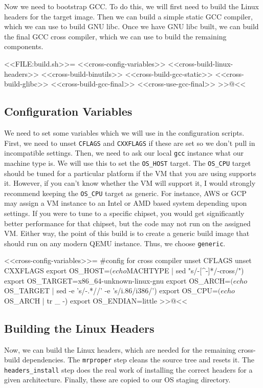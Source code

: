 Now we need to bootstrap GCC. To do this, we will first need to build the Linux
headers for the target image.  Then we can build a simple static GCC compiler,
which we can use to build GNU libc.  Once we have GNU libc built, we can build
the final GCC cross compiler, which we can use to build the remaining
components.

<<FILE:build.sh>>=
    <<cross-config-variables>>
    <<cross-build-linux-headers>>
    <<cross-build-binutils>>
    <<cross-build-gcc-static>>
    <<cross-build-glibc>>
    <<cross-build-gcc-final>>
    <<cross-use-gcc-final>>
>>@<<

\subsection{Configuration Variables}

We need to set some variables which we will use in the configuration scripts.
First, we need to unset \verb/CFLAGS/ and \verb/CXXFLAGS/ if these are set so we
don't pull in incompatible settings.  Then, we need to ask our local \verb/gcc/
instance what our machine type is.  We will use this to set the \verb/OS_HOST/
target.  The \verb/OS_CPU/ target should be tuned for a particular platform if
the VM that you are using supports it.  However, if you can't know whether the
VM will support it, I would strongly recommend keeping the \verb/OS_CPU/ target
as generic.  For instance, AWS or GCP may assign a VM instance to an Intel or
AMD based system depending upon settings.  If you were to tune to a specific
chipset, you would get significantly better performance for that chipset, but
the code may not run on the assigned VM.  Either way, the point of this build is
to create a generic build image that should run on any modern QEMU instance.
Thus, we choose \verb/generic/.

<<cross-config-variables>>=
#config for cross compiler
unset CFLAGS
unset CXXFLAGS
export OS_HOST=$(echo ${MACHTYPE} | sed "s/-[^-]*/-cross/")
export OS_TARGET=x86_64-unknown-linux-gnu
export OS_ARCH=$(echo ${OS_TARGET} | sed -e 's/-.*//' -e 's/i.86/i386/')
export OS_CPU=$(echo ${OS_ARCH} | tr _ -)
export OS_ENDIAN=little
>>@<<

\subsection{Building the Linux Headers}

Now, we can build the Linux headers, which are needed for the remaining
cross-build dependencies.  The \verb/mrproper/ step cleans the source tree and
resets it. The \verb/headers_install/ step does the real work of installing the
correct headers for a given architecture.  Finally, these are copied to our OS
staging directory.

